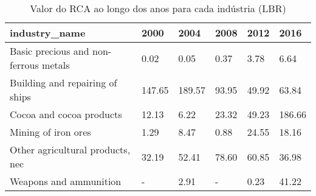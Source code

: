 \begin{table}
\centering
\caption{Valor do RCA ao longo dos anos para cada indústria (LBR)}
\begin{tabular}{p{6cm}p{1.5cm}p{1.5cm}p{1.5cm}p{1.5cm}p{1.5cm}}
\toprule
                        industry\_name &   2000 &   2004 &  2008 &  2012 &   2016 \\
\midrule
Basic precious and non-ferrous metals &   0.02 &   0.05 &  0.37 &  3.78 &   6.64 \\
      Building and repairing of ships & 147.65 & 189.57 & 93.95 & 49.92 &  63.84 \\
             Cocoa and cocoa products &  12.13 &   6.22 & 23.32 & 49.23 & 186.66 \\
                  Mining of iron ores &   1.29 &   8.47 &  0.88 & 24.55 &  18.16 \\
     Other agricultural products, nec &  32.19 &  52.41 & 78.60 & 60.85 &  36.98 \\
               Weapons and ammunition &      - &   2.91 &     - &  0.23 &  41.22 \\
\bottomrule
\end{tabular}
\end{table}
